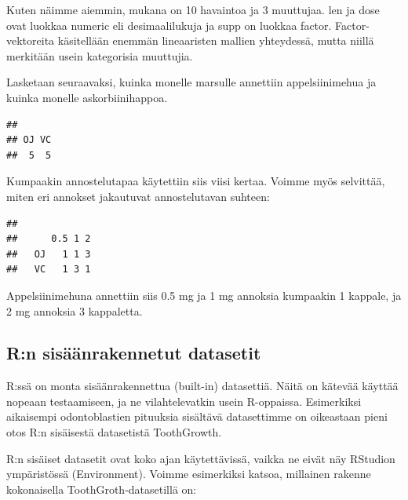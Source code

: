 \documentclass[
]{book}
\newenvironment{Shaded}{\begin{snugshade}}{\end{snugshade}}
\newcommand{\FunctionTok}[1]{\textcolor[rgb]{0.00,0.00,0.00}{#1}}
\newcommand{\NormalTok}[1]{#1}
\newcommand{\SpecialCharTok}[1]{\textcolor[rgb]{0.00,0.00,0.00}{#1}}
\begin{document}
Kuten näimme aiemmin, mukana on 10 havaintoa ja 3 muuttujaa. len ja dose ovat luokkaa numeric eli desimaalilukuja ja supp on luokkaa factor. Factor-vektoreita käsitellään enemmän lineaaristen mallien yhteydessä, mutta niillä merkitään usein kategorisia muuttujia.

Lasketaan seuraavaksi, kuinka monelle marsulle annettiin appelsiinimehua ja kuinka monelle askorbiinihappoa.

\begin{Shaded}
\end{Shaded}

\begin{verbatim}
## 
## OJ VC 
##  5  5
\end{verbatim}

Kumpaakin annostelutapaa käytettiin siis viisi kertaa. Voimme myös selvittää, miten eri annokset jakautuvat annostelutavan suhteen:

\begin{Shaded}
\end{Shaded}

\begin{verbatim}
##     
##      0.5 1 2
##   OJ   1 1 3
##   VC   1 3 1
\end{verbatim}

Appelsiinimehuna annettiin siis 0.5 mg ja 1 mg annoksia kumpaakin 1 kappale, ja 2 mg annoksia 3 kappaletta.

\hypertarget{rn-sisuxe4uxe4nrakennetut-datasetit}{%
\subsection{R:n sisäänrakennetut datasetit}\label{rn-sisuxe4uxe4nrakennetut-datasetit}}

R:ssä on monta sisäänrakennettua (built-in) datasettiä. Näitä on kätevää käyttää nopeaan testaamiseen, ja ne vilahtelevatkin usein R-oppaissa. Esimerkiksi aikaisempi odontoblastien pituuksia sisältävä datasettimme on oikeastaan pieni otos R:n sisäisestä datasetistä ToothGrowth.

R:n sisäiset datasetit ovat koko ajan käytettävissä, vaikka ne eivät näy RStudion ympäristössä (Environment). Voimme esimerkiksi katsoa, millainen rakenne kokonaisella ToothGroth-datasetillä on:
\end{document}
